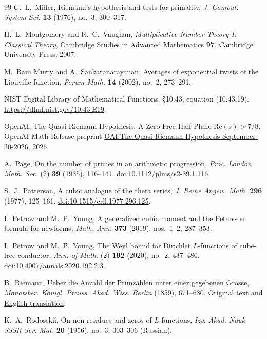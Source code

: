 \documentclass[11pt,a4paper]{article}
\numberwithin{equation}{section}
\numberwithin{figure}{section}
\theoremstyle{definition}
\theoremstyle{remark}
\begin{document}
\begin{thebibliography}{99}
G.~L.~Miller,
Riemann's hypothesis and tests for primality,
\emph{J. Comput. System Sci.} \textbf{13} (1976), no.~3, 300--317.

H.~L.~Montgomery and R.~C.~Vaughan,
\emph{Multiplicative Number Theory I: Classical Theory},
Cambridge Studies in Advanced Mathematics \textbf{97},
Cambridge University Press, 2007.

M.~Ram Murty and A.~Sankaranarayanan,
Averages of exponential twists of the Liouville function,
\emph{Forum Math.} \textbf{14} (2002), no.~2, 273--291.

{\raggedright
NIST Digital Library of Mathematical Functions,
\S10.43, equation (10.43.19).
\href{https://dlmf.nist.gov/10.43.E19}{https://dlmf.nist.gov/10.43.E19}.
\par}

OpenAI,
The Quasi-Riemann Hypothesis: A Zero-Free Half-Plane $\mathrm{Re}(s)>7/8$,
OpenAI Math Release preprint
\href{https://github.com/openai/math/blob/main/preprints/The-Quasi-Riemann-Hypothesis-September-30-2026/paper.pdf}{OAI:The-Quasi-Riemann-Hypothesis-September-30-2026},
2026.

A.~Page,
On the number of primes in an arithmetic progression,
\emph{Proc. London Math. Soc.} (2) \textbf{39} (1935), 116--141.
\href{https://doi.org/10.1112/plms/s2-39.1.116}
{doi:10.1112/plms/s2-39.1.116}.

S.~J.~Patterson,
A cubic analogue of the theta series,
\emph{J. Reine Angew. Math.} \textbf{296} (1977), 125--161.
\href{https://doi.org/10.1515/crll.1977.296.125}
{doi:10.1515/crll.1977.296.125}.

I.~Petrow and M.~P.~Young,
A generalized cubic moment and the Petersson formula for newforms,
\emph{Math. Ann.} \textbf{373} (2019), nos.~1--2, 287--353.

I.~Petrow and M.~P.~Young,
The Weyl bound for Dirichlet $L$-functions of cube-free conductor,
\emph{Ann. of Math.} (2) \textbf{192} (2020), no.~2, 437--486.
\href{https://doi.org/10.4007/annals.2020.192.2.3}
{doi:10.4007/annals.2020.192.2.3}.

B.~Riemann,
Ueber die Anzahl der Primzahlen unter einer gegebenen Gr\"osse,
\emph{Monatsber. K\"onigl. Preuss. Akad. Wiss. Berlin}
(1859), 671--680.
\href{https://www.maths.tcd.ie/pub/HistMath/People/Riemann/Zeta/}
{Original text and English translation}.

K.~A.~Rodosski\u{\i},
On non-residues and zeros of $L$-functions,
\emph{Izv. Akad. Nauk SSSR Ser. Mat.} \textbf{20} (1956),
no.~3, 303--306 (Russian).


\end{thebibliography}
\end{document}
